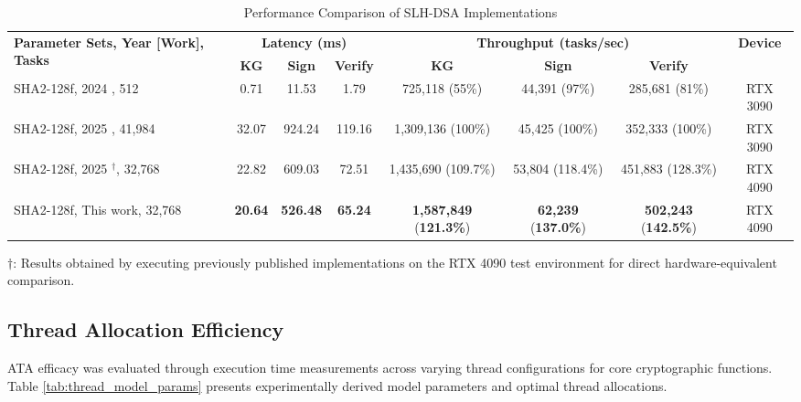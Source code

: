\documentclass[journal]{IEEEtran}
\begin{document}
\begin{table*}[htpb]
  \centering
  \caption{Performance Comparison of SLH-DSA Implementations}
  \label{tab:comparative_perf}
  \begin{tabular}{@{}lccccccc@{}}
    \toprule
    \multirow{2}{*}{\textbf{Parameter Sets, Year [Work], Tasks}} & \multicolumn{3}{c}{\textbf{Latency (ms)}} & \multicolumn{3}{c}{\textbf{Throughput (tasks/sec)}} & \multirow{2}{*}{\textbf{Device}} \\
    \cmidrule(lr){2-4} \cmidrule(lr){5-7}
    & \textbf{KG} & \textbf{Sign} & \textbf{Verify} & \textbf{KG} & \textbf{Sign} & \textbf{Verify} & \\
    \midrule
    SHA2-128f, 2024 \cite{Kim2024}, 512  & 0.71 & 11.53 & 1.79 & 725,118 (55\%) & 44,391 (97\%) & 285,681 (81\%) & RTX 3090 \\
    SHA2-128f, 2025 \cite{Wang2025}, 41,984 & 32.07 & 924.24 & 119.16 & 1,309,136 (100\%) & 45,425 (100\%) & 352,333 (100\%) & RTX 3090 \\
    SHA2-128f, 2025 \cite{Wang2025}$^\dagger$, 32,768 & 22.82 & 609.03 & 72.51 & 1,435,690 (109.7\%) & 53,804 (118.4\%) & 451,883 (128.3\%) & RTX 4090 \\
    SHA2-128f, This work, 32,768 & \textbf{20.64} & \textbf{526.48} & \textbf{65.24} & \textbf{1,587,849} (\textbf{121.3\%}) & \textbf{62,239} (\textbf{137.0\%}) & \textbf{502,243} (\textbf{142.5\%}) & RTX 4090 \\
    \bottomrule
  \end{tabular}
  \begin{tablenotes}
  \item[] $\dagger$: Results obtained by executing previously published implementations on the RTX 4090 test environment for direct hardware-equivalent comparison.
  \end{tablenotes}
\end{table*}

\subsection{Thread Allocation Efficiency}

ATA efficacy was evaluated through execution time measurements across varying thread configurations for core cryptographic functions. Table \ref{tab:thread_model_params} presents experimentally derived model parameters and optimal thread allocations.
\end{document}
